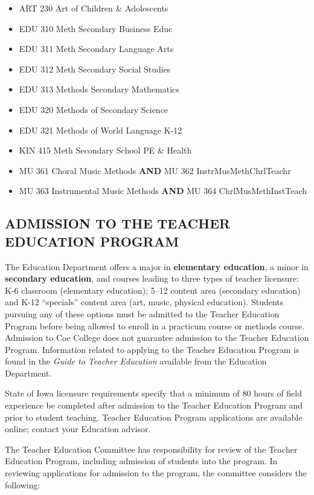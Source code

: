 \documentclass[
  letterpaper,
]{scrbook}
\providecommand{\tightlist}{%
  \setlength{\itemsep}{0pt}\setlength{\parskip}{0pt}}
\begin{document}
\begin{enumerate}
  \begin{itemize}
  \tightlist
  \item
    ART 230 Art of Children \& Adolescents
  \item
    EDU 310 Meth Secondary Business Educ
  \item
    EDU 311 Meth Secondary Language Arts
  \item
    EDU 312 Meth Secondary Social Studies
  \item
    EDU 313 Methods Secondary Mathematics
  \item
    EDU 320 Methods of Secondary Science
  \item
    EDU 321 Methods of World Language K-12
  \item
    KIN 415 Meth Secondary School PE \& Health
  \item
    MU 361 Choral Music Methods \textbf{AND} MU 362
    InstrMusMethChrlTeachr
  \item
    MU 363 Instrumental Music Methods \textbf{AND} MU 364
    ChrlMusMethInstTeach
  \end{itemize}
\end{enumerate}

\subsection{ADMISSION TO THE TEACHER EDUCATION
PROGRAM}\label{admission-to-the-teacher-education-program}

The Education Department offers a major in \textbf{elementary
education}, a minor in \textbf{secondary education}, and courses leading
to three types of teacher licensure: K-6 classroom (elementary
education); 5--12 content area (secondary education) and K-12
``specials'' content area (art, music, physical education). Students
pursuing any of these options must be admitted to the Teacher Education
Program before being allowed to enroll in a practicum course or methods
course. Admission to Coe College does not guarantee admission to the
Teacher Education Program. Information related to applying to the
Teacher Education Program is found in the \emph{Guide to Teacher
Education} available from the Education Department.

State of Iowa licensure requirements specify that a minimum of 80 hours
of field experience be completed after admission to the Teacher
Education Program and prior to student teaching. Teacher Education
Program applications are available online; contact your Education
advisor.

The Teacher Education Committee has responsibility for review of the
Teacher Education Program, including admission of students into the
program. In reviewing applications for admission to the program, the
committee considers the following:
\end{document}
